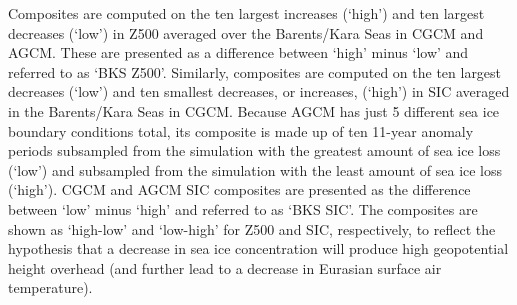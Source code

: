 \documentclass{nature}
\begin{document}
\begin{methods}
Composites are computed on the ten largest increases (`high') and ten largest decreases (`low') in Z500 averaged over the Barents/Kara Seas in CGCM and AGCM. These are presented as a difference between `high' minus `low' and referred to as `BKS Z500'. Similarly, composites are computed on the ten largest decreases (`low') and ten smallest decreases, or increases, (`high') in SIC averaged in the Barents/Kara Seas in CGCM. Because AGCM has just 5 different sea ice boundary conditions total, its composite is made up of ten 11-year anomaly periods subsampled from the simulation with the greatest amount of sea ice loss (`low') and subsampled from the simulation with the least amount of sea ice loss (`high'). CGCM and AGCM SIC composites are presented as the difference between `low' minus `high' and referred to as `BKS SIC'. The composites are shown as `high-low' and `low-high' for Z500 and SIC, respectively, to reflect the hypothesis that a decrease in sea ice concentration will produce high geopotential height overhead (and further lead to a decrease in Eurasian surface air temperature).

\end{methods}
\end{document}

